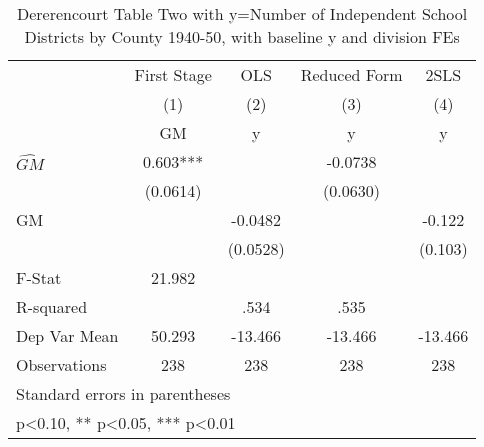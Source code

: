 \begin{table}[htbp]\centering
\def\sym#1{\ifmmode^{#1}\else\(^{#1}\)\fi}
\caption{Dererencourt Table Two with y=Number of Independent School Districts by County 1940-50, with baseline y and division FEs}
\begin{tabular}{l*{4}{c}}
\toprule
                    & First Stage   &         OLS   &Reduced Form   &        2SLS   \\
                    &\multicolumn{1}{c}{(1)}&\multicolumn{1}{c}{(2)}&\multicolumn{1}{c}{(3)}&\multicolumn{1}{c}{(4)}\\
                    &\multicolumn{1}{c}{GM}&\multicolumn{1}{c}{y}&\multicolumn{1}{c}{y}&\multicolumn{1}{c}{y}\\
\midrule
$\hat{GM}$          &       0.603***&               &     -0.0738   &               \\
                    &    (0.0614)   &               &    (0.0630)   &               \\
\addlinespace
GM                  &               &     -0.0482   &               &      -0.122   \\
                    &               &    (0.0528)   &               &     (0.103)   \\
\midrule
F-Stat              &      21.982   &               &               &               \\
R-squared           &               &        .534   &        .535   &               \\
Dep Var Mean        &      50.293   &     -13.466   &     -13.466   &     -13.466   \\
Observations        &         238   &         238   &         238   &         238   \\
\bottomrule
\multicolumn{5}{l}{\footnotesize Standard errors in parentheses}\\
\multicolumn{5}{l}{\footnotesize * p<0.10, ** p<0.05, *** p<0.01}\\
\end{tabular}
\end{table}
